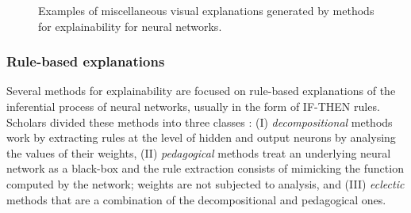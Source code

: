 \documentclass[final,1p,times]{elsarticle}
\begin{document}
\begin{figure}[!ht]
\begin{minipage}{\textwidth}
\centering
  \begin{subfigure}[b]{.17\linewidth}
  \centering
  \newline
  \end{subfigure}
  \begin{subfigure}[b]{.23\linewidth}
  \centering
  \newline
  \end{subfigure}
  \begin{subfigure}[b]{.27\linewidth}
  \centering
  \end{subfigure}
  \begin{subfigure}[b]{.23\linewidth}
  \centering
  \end{subfigure}
  \caption{Examples of miscellaneous visual explanations generated by methods for explainability for neural networks.}
  \label{fig:neural_networks_miscellaneous}
\end{minipage}
\end{figure}


\subsubsection{Rule-based explanations}
Several methods for explainability are focused on rule-based explanations of the inferential process of neural networks, usually in the form of IF-THEN rules. Scholars divided these methods into three classes \cite{hailesilassie2016rule,bologna2018comparison}: (I) \textit{decompositional} methods work by extracting rules at the level of hidden and output neurons by analysing the values of their weights, (II) \textit{pedagogical} methods treat an underlying neural network as a black-box and the rule extraction consists of mimicking the function computed by the network; weights are not subjected to analysis, and (III) \textit{eclectic} methods that are a combination of the decompositional and pedagogical ones.\\
\end{document}
